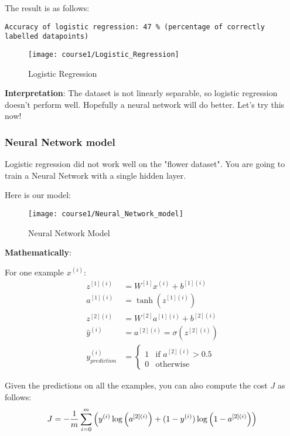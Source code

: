 The result is as follows:
\begin{verbatim}
Accuracy of logistic regression: 47 % (percentage of correctly labelled datapoints)
\end{verbatim}
\begin{figure}[h]
\begin{center}
\texttt{[image: course1/Logistic\_Regression]}
\end{center}
\caption{Logistic Regression}
\label{fig:Logistic_Regression}
\end{figure}

{\textbf {Interpretation}}: The dataset is not linearly separable, so logistic regression doesn't perform well. Hopefully a neural network will do better. Let's try this now!

\subsubsection{Neural Network model}

Logistic regression did not work well on the "flower dataset". You are going to train a Neural Network with a single hidden layer.

Here is our model:
\begin{figure}[h]
\begin{center}
\texttt{[image: course1/Neural\_Network\_model]}
\end{center}
\caption{Neural Network Model}
\label{fig:Neural_Network_model}
\end{figure}

{\textbf {Mathematically}}:

For one example $x^{(i)}$:
\begin{align}
z^{[1] (i)} &=  W^{[1]} x^{(i)} + b^{[1] (i)}\\
a^{[1] (i)} &= \tanh(z^{[1] (i)})\\
z^{[2] (i)} &= W^{[2]} a^{[1] (i)} + b^{[2] (i)}\\
\hat{y}^{(i)} &= a^{[2] (i)} = \sigma(z^{ [2] (i)})\\
y^{(i)}_{prediction} &= \begin{cases} 1 & \mbox{if } a^{[2](i)} > 0.5 \\ 0 & \mbox{otherwise } \end{cases}
\end{align}

Given the predictions on all the examples, you can also compute the cost $J$ as follows:
\begin{align}
J = - \frac{1}{m} \sum\limits_{i = 0}^{m} \large\left(\small y^{(i)}\log\left(a^{[2] (i)}\right) + (1-y^{(i)})\log\left(1- a^{[2] (i)}\right)  \large  \right) \small 
\end{align}



